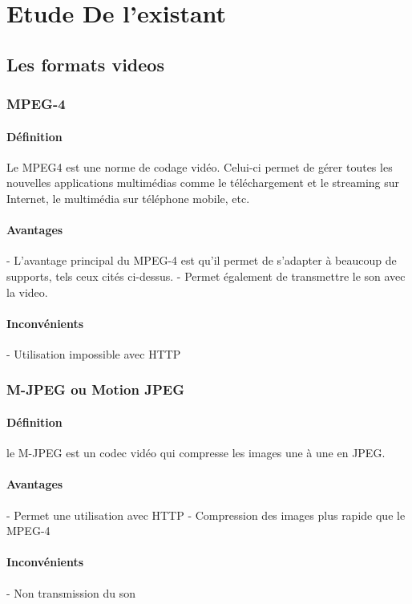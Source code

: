 \chapter{Etude De l'existant}
	\section{Les formats videos}
		\subsection{MPEG-4}
		\subsubsection{Définition}
		Le MPEG4 est une norme de codage vidéo. Celui-ci
		permet de gérer toutes les nouvelles applications multimédias comme le téléchargement et le
		streaming sur Internet, le multimédia sur téléphone mobile, etc.
		\subsubsection{Avantages}
		- L'avantage principal du MPEG-4 est qu'il permet de s'adapter à beaucoup de
		supports, tels ceux cités ci-dessus.
		- Permet également de transmettre le son avec la video.
		\subsubsection{Inconvénients}
		- Utilisation impossible avec HTTP
		
		\subsection{M-JPEG ou Motion JPEG}
		\subsubsection{Définition}
		le M-JPEG est un codec vidéo qui compresse les images une à une en JPEG.
		\subsubsection{Avantages}
		- Permet une utilisation avec HTTP
		- Compression des images plus rapide que le MPEG-4
		
		\subsubsection{Inconvénients}
		- Non transmission du son
		
